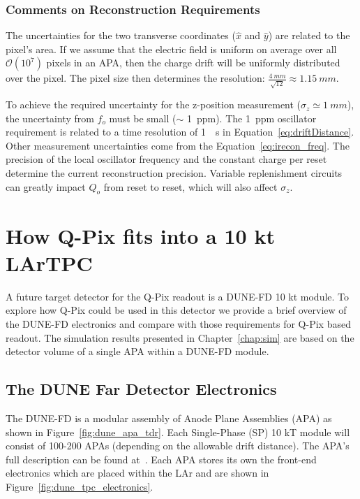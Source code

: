 \subsubsection{Comments on Reconstruction Requirements}
\label{sec:recon_uncert}
The uncertainties for the two transverse coordinates ($\hat{x}$ and $\hat{y}$) are related to the pixel's area.
If we assume that the electric field is uniform on average over all $\mathcal{O}(10^{7})$ pixels in an APA, then the charge drift will be uniformly distributed over the pixel.
The pixel size then determines the resolution: $\frac{4~\unit{mm}}{\sqrt{12}} \approx 1.15~\unit{mm}$.

To achieve the required uncertainty for the z-position measurement ($\sigma_{z} \simeq 1~\unit{mm}$), the uncertainty from $f_{o}$ must be small ($\sim$ 1~\unit{ppm}).
The 1~\unit{ppm} oscillator requirement is related to a time resolution of 1~\unit{\mu s} in Equation~\ref{eq:driftDistance}.
Other measurement uncertainties come from the Equation~\ref{eq:irecon_freq}.
The precision of the local oscillator frequency and the constant charge per reset determine the current reconstruction precision.
Variable replenishment circuits can greatly impact $Q_{o}$ from reset to reset, which will also affect $\sigma_{z}$.

\section{How Q-Pix fits into a 10 kt LArTPC}
\label{sec:qpix_apa}
A future target detector for the Q-Pix readout is a DUNE-FD 10 kt module.
To explore how Q-Pix could be used in this detector we provide a brief overview of the DUNE-FD electronics and compare with those requirements for Q-Pix based readout.
The simulation results presented in Chapter~\ref{chap:sim} are based on the detector volume of a single APA within a DUNE-FD module.

\subsection{The DUNE Far Detector Electronics}
The DUNE-FD is a modular assembly of Anode Plane Assemblies (APA) as shown in Figure~\ref{fig:dune_apa_tdr}.
Each Single-Phase (SP) 10 kT module will consist of 100-200 APAs (depending on the allowable drift distance).
The APA's full description can be found at~\citep{DUNE-FD_TDRv4:Abi_2020}.
Each APA stores its own the front-end electronics which are placed within the LAr and are shown in Figure~\ref{fig:dune_tpc_electronics}.

